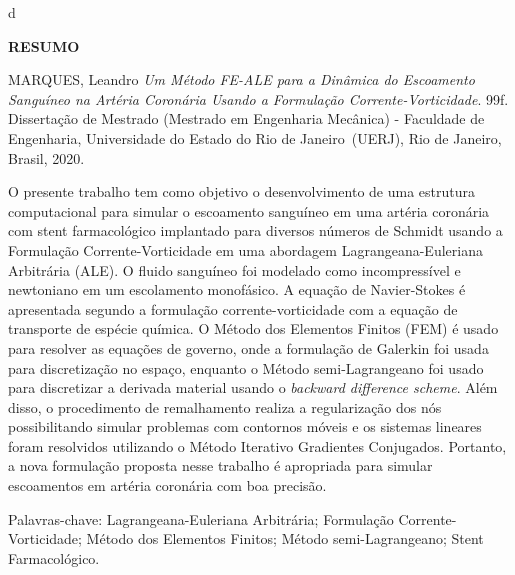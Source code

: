 d\begin{center}
\textbf{RESUMO}
\end{center}


$\!$\\

\hspace{-1.3cm}MARQUES, Leandro \textit{Um Método FE-ALE para a Dinâmica do Escoamento Sanguíneo na Artéria Coronária Usando a Formulação Corrente-Vorticidade}. 99f. Dissertação de Mestrado (Mestrado em Engenharia Mecânica) - Faculdade de Engenharia, Universidade do Estado do Rio de Janeiro~(UERJ), Rio de Janeiro, Brasil, 2020.

\vspace{.2cm}

\indent 
O presente trabalho tem como objetivo o desenvolvimento 
de uma estrutura computacional para simular o escoamento 
sanguíneo em uma artéria coronária com stent farmacológico 
implantado para diversos números de Schmidt usando a Formulação Corrente-Vorticidade em uma 
abordagem Lagrangeana-Euleriana Arbitrária (ALE).
O fluido sanguíneo foi modelado como incompressível e newtoniano em um escolamento monofásico.
A equação de Navier-Stokes é apresentada segundo a formulação 
corrente-vorticidade com a equação de transporte de espécie química.
O Método dos Elementos Finitos (FEM) é usado para resolver as equações 
de governo, onde a formulação de Galerkin foi usada para 
discretização no espaço, enquanto o Método semi-Lagrangeano 
foi usado para discretizar a derivada material usando 
o \textit{backward difference scheme}. 
Além disso, o procedimento de remalhamento
realiza a regularização dos nós possibilitando
simular problemas com contornos móveis e os sistemas lineares foram resolvidos utilizando o 
Método Iterativo Gradientes Conjugados.
Portanto, a nova formulação proposta
nesse trabalho é apropriada para
simular escoamentos em artéria coronária com boa precisão.

\vspace{1cm}

\hspace{-1.3cm}Palavras-chave: Lagrangeana-Euleriana Arbitrária; Formulação Corrente-Vorticidade; Método dos Elementos Finitos; Método semi-Lagrangeano; Stent Farmacológico.

